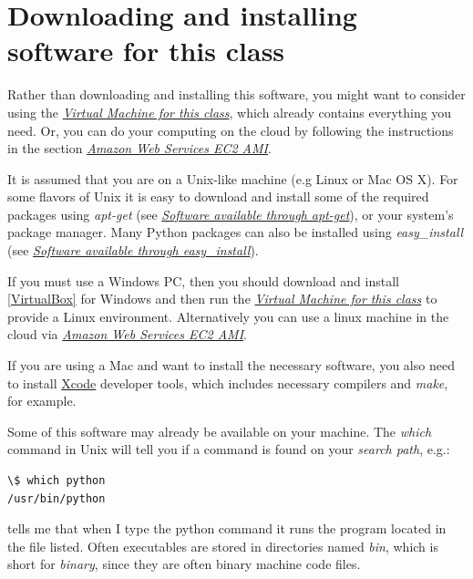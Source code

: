 \documentclass[letterpaper,10pt,english]{sphinxmanual}
\begin{document}
\section{Downloading and installing software for this class}
\label{software_installation::doc}\label{software_installation:software-installation}\label{software_installation:downloading-and-installing-software-for-this-class}
Rather than downloading and installing this software, you might want to
consider using the {\hyperref[vm:vm]{\emph{Virtual Machine for this class}}}, which already contains everything you need.
Or, you can do your computing on the cloud by following the instructions in
the section {\hyperref[aws:aws]{\emph{Amazon Web Services EC2 AMI}}}.

It is assumed that you are on a Unix-like machine (e.g Linux or Mac OS
X).  For some flavors of Unix it is easy to download and install some
of the required packages using \emph{apt-get} (see {\hyperref[software_installation:apt-get]{\emph{Software available through apt-get}}}),
or your system's package
manager.  Many Python packages can also be installed using
\emph{easy\_install} (see {\hyperref[software_installation:easy-install]{\emph{Software available through easy\_install}}}).

If you must use a Windows PC, then you should
download and install {\hyperref[biblio:virtualbox]{{[}VirtualBox{]}}} for Windows and then
run the {\hyperref[vm:vm]{\emph{Virtual Machine for this class}}} to provide a Linux environment.  Alternatively you can use
a linux machine in the cloud via {\hyperref[aws:aws]{\emph{Amazon Web Services EC2 AMI}}}.

If you are using a Mac and want to install the necessary software, you also
need to install \href{https://developer.apple.com/xcode/}{Xcode} developer
tools, which includes necessary compilers and \emph{make}, for example.

Some of this software may already be available on your machine.  The \emph{which}
command in Unix will tell you if a command is found on your \emph{search path},
e.g.:

\begin{Verbatim}[commandchars=\\\{\}]
\$ which python
/usr/bin/python
\end{Verbatim}

tells me that when I type the python command it runs the program located in
the file listed. Often executables are stored in directories named \emph{bin},
which is short for \emph{binary}, since they are often binary machine code files.
\end{document}
